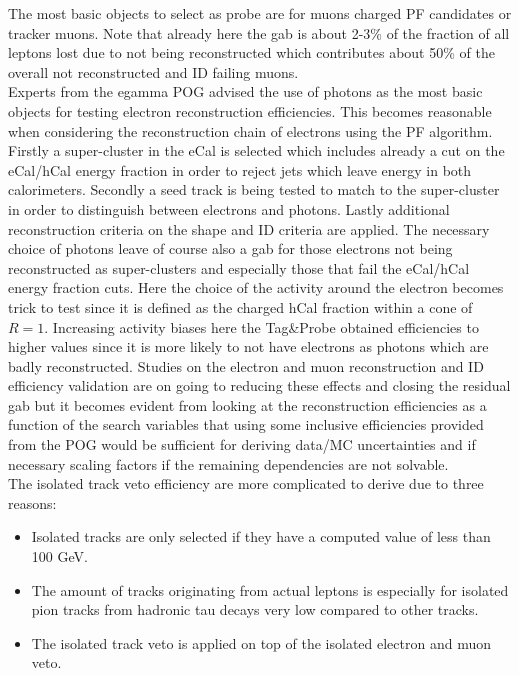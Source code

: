 The most basic objects to select as probe are for muons charged PF candidates or tracker muons. Note that already here the gab is about 2-3\% of the fraction of all leptons lost due to not being reconstructed which contributes about 50\% of the overall not reconstructed and ID failing muons.\\
Experts from the egamma POG advised the use of photons as the most basic objects for testing electron reconstruction efficiencies. This becomes reasonable when considering the reconstruction chain of electrons using the PF algorithm.
Firstly a super-cluster in the eCal is selected which includes already a cut on the eCal/hCal energy fraction in order to reject jets which leave energy in both calorimeters. Secondly a seed track is being tested to match to the super-cluster in order to distinguish between electrons and photons. Lastly additional reconstruction criteria on the shape and ID criteria are applied.
The necessary choice of photons leave of course also a gab for those electrons not being reconstructed as super-clusters and especially those that fail the eCal/hCal energy fraction cuts. Here the choice of the activity around the electron becomes trick to test since it is defined as the charged hCal fraction within a cone of $R=1$. Increasing activity biases here the Tag\&Probe obtained efficiencies to higher values since it is more likely to not have electrons as photons which are badly reconstructed.
Studies on the electron and muon reconstruction and ID efficiency validation are on going to reducing these effects and closing the residual gab but it becomes evident from looking at the reconstruction efficiencies as a function of the search variables that using some inclusive efficiencies provided from the POG would be sufficient for deriving data/MC uncertainties and if necessary scaling factors if the remaining dependencies are not solvable.\\
The isolated track veto efficiency are more complicated to derive due to three reasons:
\begin{itemize}
 \item Isolated tracks are only selected if they have a computed \mt value of less than 100 GeV.
 \item The amount of tracks originating from actual leptons is especially for isolated pion tracks from hadronic tau decays very low compared to other tracks.
 \item The isolated track veto is applied on top of the isolated electron and muon veto.
\end{itemize}


